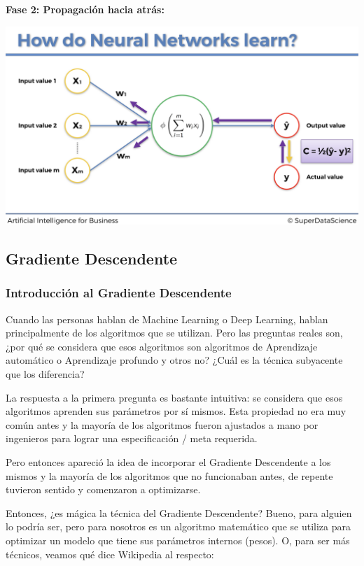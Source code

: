 \documentclass[]{book}
\begin{document}
\textbf{Fase 2: Propagación hacia atrás:}

\includegraphics{Images/ANN_19.png}

\hypertarget{gradiente-descendente}{%
\subsection{Gradiente Descendente}\label{gradiente-descendente}}

\hypertarget{introducciuxf3n-al-gradiente-descendente}{%
\subsubsection{Introducción al Gradiente Descendente}\label{introducciuxf3n-al-gradiente-descendente}}

Cuando las personas hablan de Machine Learning o Deep Learning, hablan principalmente de los algoritmos que se utilizan. Pero las preguntas reales son, ¿por qué se considera que esos algoritmos son algoritmos de Aprendizaje automático o Aprendizaje profundo y otros no? ¿Cuál es la técnica subyacente que los diferencia?

La respuesta a la primera pregunta es bastante intuitiva: se considera que esos algoritmos aprenden sus parámetros por sí mismos. Esta propiedad no era muy común antes y la mayoría de los algoritmos fueron ajustados a mano por ingenieros para lograr una especificación / meta requerida.

Pero entonces apareció la idea de incorporar el Gradiente Descendente a los mismos y la mayoría de los algoritmos que no funcionaban antes, de repente tuvieron sentido y comenzaron a optimizarse.

Entonces, ¿es mágica la técnica del Gradiente Descendente? Bueno, para alguien lo podría ser, pero para nosotros es un algoritmo matemático que se utiliza para optimizar un modelo que tiene sus parámetros internos (pesos). O, para ser más técnicos, veamos qué dice Wikipedia al respecto:
\end{document}

